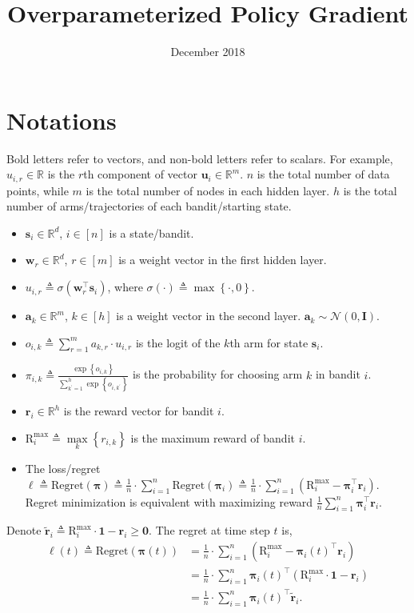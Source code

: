 \documentclass[10pt]{article}
\title{Overparameterized Policy Gradient}
\author{}
\date{December 2018}
\def\rva{{\mathbf{a}}}
\def\rvr{{\mathbf{r}}}
\def\rvs{{\mathbf{s}}}
\def\rvu{{\mathbf{u}}}
\def\rvw{{\mathbf{w}}}
\def\rvone{{\mathbf{1}}}
\def\rvzero{{\mathbf{0}}}
\def\rvtilder{{\tilde{\mathbf{r}}}}
\def\r{{\text{R}}}
\def\regret{{\text{Regret}}}
\def\rvpi{{\boldsymbol{\pi}}}
\def\rmI{{\mathbf{I}}}
\def\sR{{\mathbb{R}}}
\def\gN{{\mathcal{N}}}
\begin{document}
\maketitle

\section{Notations}

Bold letters refer to vectors, and non-bold letters refer to scalars. For example, $u_{i,r} \in \sR$ is the $r$th component of vector $\rvu_i \in \sR^m$. $n$ is the total number of data points, while $m$ is the total number of nodes in each hidden layer. $h$ is the total number of arms/trajectories of each bandit/starting state.

\begin{itemize}
	\item $\rvs_i \in \sR^d$, $i \in [n]$ is a state/bandit.
	\item $\rvw_r \in \sR^d$, $r \in [m]$ is a weight vector in the first hidden layer.
	\item $u_{i,r} \triangleq \sigma(\rvw_r^\top \rvs_i)$, where $\sigma(\cdot) \triangleq \max\left\{ \cdot, 0 \right\}$.
	\item $\rva_k \in \sR^m$, $k \in [h]$ is a weight vector in the second layer. $\rva_k \sim \gN(0, \rmI)$.
	\item $o_{i,k} \triangleq \sum\limits_{r=1}^{m}{a_{k,r} \cdot u_{i,r}}$ is the logit of the $k$th arm for state $\rvs_i$.
	\item $\pi_{i,k} \triangleq \frac{\exp\left\{ o_{i,k} \right\}}{\sum\limits_{k^\prime = 1}^{h}{\exp\left\{ o_{i,k^\prime} \right\}}}$ is the  probability for choosing arm $k$ in bandit $i$.
	\item $\rvr_i \in \sR^h$ is the reward vector for bandit $i$.
	\item $\r_i^{\max} \triangleq \max\limits_{k}\left\{ r_{i,k} \right\}$ is the maximum reward of bandit $i$.
	\item The loss/regret $\ell \triangleq \regret(\rvpi) \triangleq \frac{1}{n} \cdot \sum\limits_{i=1}^{n}{ \regret(\rvpi_i) } \triangleq \frac{1}{n} \cdot \sum\limits_{i=1}^{n}{ \left( \r_i^{\max} - \rvpi_i^\top \rvr_i \right) }$. Regret minimization is equivalent with maximizing reward $\frac{1}{n} \sum\limits_{i=1}^{n}{\rvpi_i^\top \rvr_i}$.
\end{itemize}

Denote $\rvtilder_{i} \triangleq \r_i^{\max} \cdot \rvone -  \rvr_{i} \ge \rvzero$. The regret at time step $t$ is,
\begin{equation*}
\begin{split}
	\ell(t) \triangleq \regret(\rvpi(t)) &= \frac{1}{n} \cdot \sum\limits_{i=1}^{n}{ \left( \r_i^{\max} - \rvpi_{i}(t)^\top \rvr_i \right) } \\
	&= \frac{1}{n} \cdot \sum\limits_{i=1}^{n}{ \rvpi_{i}(t)^\top \left( \r_i^{\max} \cdot \rvone - \rvr_{i} \right) } \\
	&= \frac{1}{n} \cdot \sum\limits_{i=1}^{n}{ \rvpi_{i}(t)^\top \rvtilder_{i} }.
\end{split}
\end{equation*}
\end{document}
